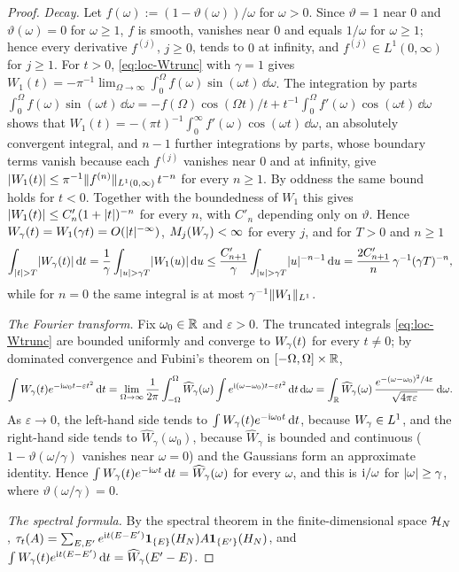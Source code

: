\begin{proof}
\emph{Decay.} Let $f(\omega):=(1-\vartheta(\omega))/\omega$ for $\omega>0$. Since $\vartheta=1$ near $0$ and $\vartheta(\omega)=0$ for
$\omega\ge1$, $f$ is smooth, vanishes near $0$ and equals $1/\omega$ for $\omega\ge1$; hence every derivative
$f^{(j)}$, $j\ge0$, tends to $0$ at infinity, and $f^{(j)}\in L^1(0,\infty)$ for $j\ge1$. For $t>0$,
\eqref{eq:loc-Wtrunc} with $\gamma=1$ gives $W_1(t)=-\pi^{-1}\lim_{\Omega\to\infty}\int_0^\Omega f(\omega)\sin(\omega t)\,\dd\omega$.
The integration by parts
$\int_0^\Omega f(\omega)\sin(\omega t)\,\dd\omega=-f(\Omega)\cos(\Omega t)/t+t^{-1}\int_0^\Omega f'(\omega)\cos(\omega t)\,\dd\omega$
shows that $W_1(t)=-(\pi t)^{-1}\int_0^\infty f'(\omega)\cos(\omega t)\,\dd\omega$, an absolutely convergent integral, and
$n-1$ further integrations by parts, whose boundary terms vanish because each $f^{(j)}$ vanishes near $0$ and at
infinity, give $\lvert W_1(t)\rvert\le\pi^{-1}\lVert f^{(n)}\rVert_{L^1(0,\infty)}\,t^{-n}$ for every $n\ge1$. By oddness the same
bound holds for $t<0$. Together with the boundedness of $W_1$ this gives $\lvert W_1(t)\rvert\le C'_n(1+\lvert t\rvert)^{-n}$ for every
$n$, with $C'_n$ depending only on $\vartheta$. Hence $W_{\gamma}(t)=W_1(\gamma t)=O(\lvert t\rvert^{-\infty})$, $M_j(W_{\gamma})<\infty$ for every
$j$, and for $T>0$ and $n\ge1$
\[
\int_{\lvert t\rvert>T}\lvert W_{\gamma}(t)\rvert\,\mathrm{d} t=\frac1\gamma\int_{\lvert u\rvert>\gamma T}\lvert W_1(u)\rvert\,\mathrm{d} u
\le\frac{C'_{n+1}}\gamma\int_{\lvert u\rvert>\gamma T}\lvert u\rvert^{-n-1}\,\mathrm{d} u=\frac{2C'_{n+1}}n\,\gamma^{-1}(\gamma T)^{-n},
\]
while for $n=0$ the same integral is at most $\gamma^{-1}\lVert W_1\rVert_{L^1}$.

\emph{The Fourier transform.} Fix $\omega_0\in\mathbb{R}$ and $\varepsilon>0$. The truncated integrals \eqref{eq:loc-Wtrunc} are
bounded uniformly and converge to $W_{\gamma}(t)$ for every $t\ne0$; by dominated convergence and Fubini's theorem on
$[-\Omega,\Omega]\times\mathbb{R}$,
\[
\int W_{\gamma}(t)e^{-\mathrm{i}\omega_0t-\varepsilon t^2}\,\mathrm{d} t
=\lim_{\Omega\to\infty}\frac1{2\pi}\int_{-\Omega}^\Omega\widehat W_\gamma(\omega)\int e^{\mathrm{i}(\omega-\omega_0)t-\varepsilon t^2}\,\mathrm{d} t\,\mathrm{d}\omega
=\int_{\mathbb{R}}\widehat W_\gamma(\omega)\,\frac{e^{-(\omega-\omega_0)^2/4\varepsilon}}{\sqrt{4\pi\varepsilon}}\,\mathrm{d}\omega .
\]
As $\varepsilon\to0$, the left-hand side tends to $\int W_{\gamma}(t)e^{-\mathrm{i}\omega_0t}\,\mathrm{d} t$, because $W_{\gamma}\in L^1$, and the
right-hand side tends to $\widehat W_\gamma(\omega_0)$, because $\widehat W_\gamma$ is bounded and continuous
($1-\vartheta(\omega/\gamma)$ vanishes near $\omega=0$) and the Gaussians form an approximate identity. Hence
$\int W_{\gamma}(t)e^{-\mathrm{i}\omega t}\,\mathrm{d} t=\widehat W_\gamma(\omega)$ for every $\omega$, and this is $\mathrm{i}/\omega$ for $\lvert\omega\rvert\ge\gamma$,
where $\vartheta(\omega/\gamma)=0$.

\emph{The spectral formula.} By the spectral theorem in the finite-dimensional space $\mathcal{H}_N$,
$\tau_t(A)=\sum_{E,E'}e^{\mathrm{i} t(E-E')}\mathbf{1}_{\{E\}}(H_N)A\mathbf{1}_{\{E'\}}(H_N)$, and
$\int W_{\gamma}(t)e^{\mathrm{i} t(E-E')}\,\mathrm{d} t=\widehat W_\gamma(E'-E)$.
\end{proof}

